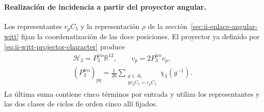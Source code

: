 \paragraph{Realización de incidencia a partir del proyector angular.}
Los representantes \(r_pC_5\) y la representación \(\rho\) de la
sección~\ref{sec:ii-enlace-angular-witt} fijan la coordenatización de las doce
posiciones. El proyector ya definido por
\eqref{eq:ii-witt-projector-character} produce
\begin{equation}
 \begin{gathered}
 \mathcal H_3=P_3^{\mathrm{ico}}\mathbb R^{12},\qquad v_p=2P_3^{\mathrm{ico}}e_p,
 \\[-2pt]
 (P_3^{\mathrm{ico}})_{pq}=\frac1{20}
 \sum_{\substack{g\in A_5\\gr_qC_5=r_pC_5}}\chi_3(g^{-1}).
 \end{gathered}
 \label{ii:dodeca:vertices-proyector}
\end{equation}
La última suma contiene cinco términos por entrada y utiliza los
representantes y las dos clases de ciclos de orden cinco allí fijados.

